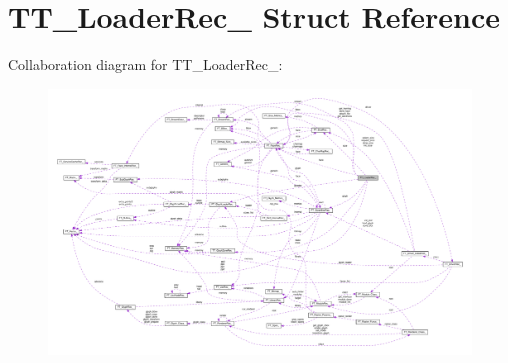 \hypertarget{structTT__LoaderRec__}{}\section{T\+T\+\_\+\+Loader\+Rec\+\_\+ Struct Reference}
\label{structTT__LoaderRec__}


Collaboration diagram for T\+T\+\_\+\+Loader\+Rec\+\_\+\+:
\nopagebreak
\begin{figure}[H]
\begin{center}
\leavevmode
\includegraphics[width=350pt]{structTT__LoaderRec____coll__graph}
\end{center}
\end{figure}
